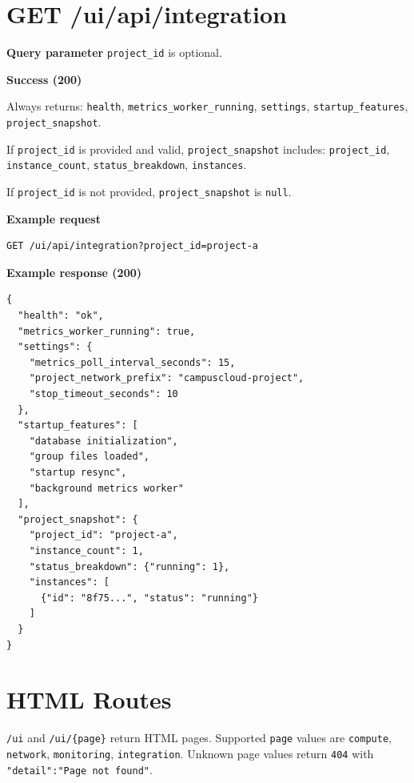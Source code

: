 \documentclass[11pt]{article}
\begin{document}
\section*{GET /ui/api/integration}

\textbf{Query parameter}
\texttt{project\_id} is optional.

\textbf{Success (200)}

Always returns:
\texttt{health}, \texttt{metrics\_worker\_running}, \texttt{settings}, \texttt{startup\_features}, \texttt{project\_snapshot}.

If \texttt{project\_id} is provided and valid, \texttt{project\_snapshot} includes:
\texttt{project\_id}, \texttt{instance\_count}, \texttt{status\_breakdown}, \texttt{instances}.

If \texttt{project\_id} is not provided, \texttt{project\_snapshot} is \texttt{null}.

\textbf{Example request}
\begin{verbatim}
GET /ui/api/integration?project_id=project-a
\end{verbatim}

\textbf{Example response (200)}
\begin{verbatim}
{
  "health": "ok",
  "metrics_worker_running": true,
  "settings": {
    "metrics_poll_interval_seconds": 15,
    "project_network_prefix": "campuscloud-project",
    "stop_timeout_seconds": 10
  },
  "startup_features": [
    "database initialization",
    "group files loaded",
    "startup resync",
    "background metrics worker"
  ],
  "project_snapshot": {
    "project_id": "project-a",
    "instance_count": 1,
    "status_breakdown": {"running": 1},
    "instances": [
      {"id": "8f75...", "status": "running"}
    ]
  }
}
\end{verbatim}

\section*{HTML Routes}

\texttt{/ui} and \texttt{/ui/\{page\}} return HTML pages.  
Supported \texttt{page} values are \texttt{compute}, \texttt{network}, \texttt{monitoring}, \texttt{integration}.  
Unknown page values return \texttt{404} with \texttt{"detail":"Page not found"}.
\end{document}

